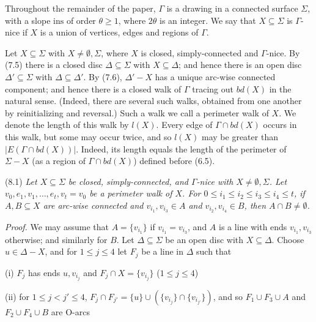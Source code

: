 
Throughout the remainder of the paper, $\Gamma$ is a drawing in a connected surface $\Sigma$, with a slope $\mathrm{ins}$ of order $\theta \ge 1$, where $2\theta$ is an integer. We say that $X \subseteq \Sigma$ is $\Gamma$-nice if $X$ is a union of vertices, edges and regions of $\Gamma$.

Let $X \subseteq \Sigma$ with $X \ne \emptyset, \Sigma$, where $X$ is closed, simply-connected and $\Gamma$-nice. By (7.5) there is a closed disc $\Delta \subseteq \Sigma$ with $X \subseteq \Delta$; and hence there is an open disc $\Delta' \subseteq \Sigma$ with $\Delta \subseteq \Delta'$. By (7.6), $\Delta' - X$ has a unique arc-wise connected component; and hence there is a closed walk of $\Gamma$ tracing out $bd(X)$ in the natural sense. (Indeed, there are several such walks, obtained from one another by reinitializing and reversal.) Such a walk we call a perimeter walk of $X$. We denote the length of this walk by $l(X)$. Every edge of $\Gamma \cap bd(X)$ occurs in this walk, but some may occur twice, and so $l(X)$ may be greater than $|E(\Gamma \cap bd(X))|$. Indeed, its length equals the length of the perimeter of $\Sigma - X$ (as a region of $\Gamma \cap bd(X)$) defined before (6.5).

\stmt
(8.1) \textit{Let $X \subseteq \Sigma$ be closed, simply-connected, and $\Gamma$-nice with $X \ne \emptyset, \Sigma$. Let $v_0, e_1, v_1, \dots, e_t, v_t = v_0$ be a perimeter walk of $X$. For $0 \le i_1 \le i_2 \le i_3 \le i_4 \le t$, if $A, B \subseteq X$ are arc-wise connected and $v_{i_1}, v_{i_3} \in A$ and $v_{i_2}, v_{i_4} \in B$, then $A \cap B \ne \emptyset$.}

\textit{Proof.} We may assume that $A = \{v_{i_1}\}$ if $v_{i_1} = v_{i_3}$, and $A$ is a line with ends $v_{i_1}, v_{i_3}$ otherwise; and similarly for $B$. Let $\Delta \subseteq \Sigma$ be an open disc with $X \subseteq \Delta$. Choose $u \in \Delta - X$, and for $1 \le j \le 4$ let $F_j$ be a line in $\Delta$ such that

\hspace*{12pt}(i) $F_j$ has ends $u, v_{i_j}$ and $F_j \cap X = \{v_{i_j}\}$ ($1 \le j \le 4$)

\hspace*{12pt}(ii) for $1 \le j < j' \le 4$, $F_j \cap F_{j'} = \{u\} \cup (\{v_{i_j}\} \cap \{v_{i_{j'}}\})$, and so $F_1 \cup F_3 \cup A$ and $F_2 \cup F_4 \cup B$ are O-arcs

